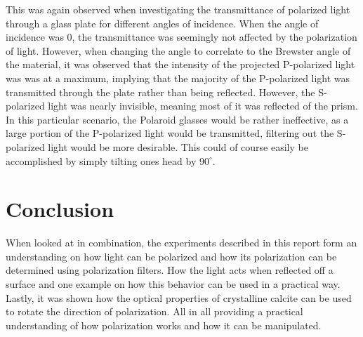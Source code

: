 \documentclass[%
 reprint,
 amsmath,amssymb,
 aps,
]{revtex4-1}
\begin{document}
    This was again observed when investigating the transmittance of polarized light through a glass plate for different angles of incidence. When the angle of incidence was 0, the transmittance was seemingly not affected by the polarization of light. However, when changing the angle to correlate to the Brewster angle of the material, it was observed that the intensity of the projected P-polarized light was was at a maximum, implying that the majority of the P-polarized light was transmitted through the plate rather than being reflected. However, the S-polarized light was nearly invisible, meaning most of it was reflected of the prism. In this particular scenario, the Polaroid glasses would be rather ineffective, as a large portion of the P-polarized light would be transmitted, filtering out the S-polarized light would be more desirable. This could of course easily be accomplished by simply tilting ones head by $90^\circ$.


\section{\label{sect:conclusion}Conclusion}
  When looked at in combination, the experiments described in this report form an understanding on how light can be polarized and how its polarization can be determined using polarization filters. How the light acts when reflected off a surface and one example on how this behavior can be used in a practical way. Lastly, it was shown how the optical properties of crystalline calcite can be used to rotate the direction of polarization. All in all providing a practical understanding of how polarization works and how it can be manipulated.
\newpage


\end{document}
